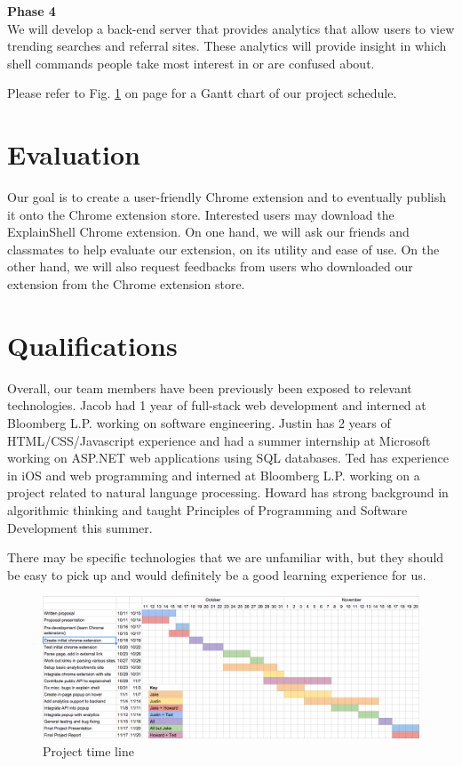 \documentclass[11pt]{article}
\begin{document}
\par{\bf Phase 4}\\
We will develop a back-end server that provides analytics that allow users to view trending searches and referral sites. These analytics will provide insight in which shell commands people take most interest in or are confused about.

Please refer to Fig. \ref{fig:timetable} on page \pageref{fig:timetable} for a Gantt chart of our project schedule.

\section{Evaluation}

Our goal is to create a user-friendly Chrome extension and to eventually publish it onto the Chrome extension store. Interested users may download the ExplainShell Chrome extension. On one hand, we will ask our friends and classmates to help evaluate our extension, on its utility and ease of use. On the other hand, we will also request feedbacks from users who downloaded our extension from the Chrome extension store.

\section{Qualifications}

Overall, our team members have been previously been exposed to relevant technologies. Jacob had 1 year of full-stack web development and interned at Bloomberg L.P. working on software engineering. Justin has 2 years of HTML/CSS/Javascript experience and had a summer internship at Microsoft working on ASP.NET web applications using SQL databases. Ted has experience in iOS and web programming and interned at Bloomberg L.P. working on a project related to natural language processing. Howard has strong background in algorithmic thinking and taught Principles of Programming and Software Development this summer. 

There may be specific technologies that we are unfamiliar with, but they should be easy to pick up and would definitely be a good learning experience for us.

\begin{landscape}
\thispagestyle{empty}
\begin{figure}[htb]
\vspace*{6em}
\hspace*{-3em}
\centering
\includegraphics[width=1.5\textwidth]{gantt-chart.png}
\caption{Project time line\label{fig:timetable}}
\end{figure}
\end{landscape}
\end{document}

